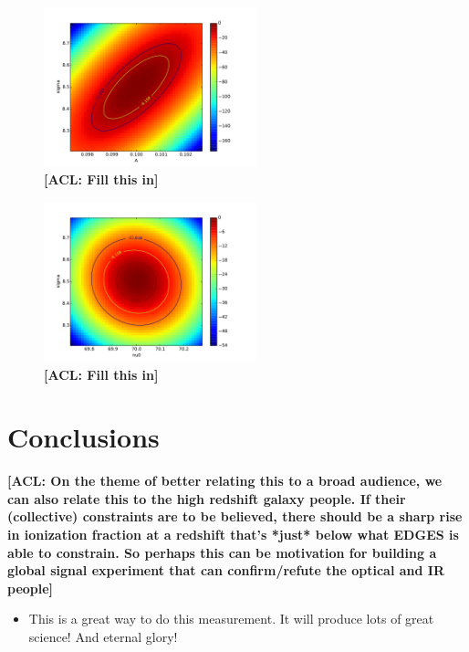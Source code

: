 \documentclass[twolcolumn,apj]{emulateapj}
\newcommand{\acl}[1]{{\color{red} \textbf{[ACL:  #1]}}}
\begin{document}
\begin{figure}[h]
	\centering
	\includegraphics[width=0.55\textwidth]{figures/contours_A_sigma.pdf}
	\caption{\acl{Fill this in}}
\end{figure}

\begin{figure}[h]
	\centering
	\includegraphics[width=0.55\textwidth]{figures/contours_nu0_sigma.pdf}
	\caption{\acl{Fill this in}}
\end{figure}

\section{Conclusions}
\label{sec:Conc}
\acl{On the theme of better relating this to a broad audience, we can also relate this to the high redshift galaxy people.  If their (collective) constraints are to be believed, there should be a sharp rise in ionization fraction at a redshift that's *just* below what EDGES is able to constrain.  So perhaps this can be motivation for building a global signal experiment that can confirm/refute the optical and IR people}
\begin{itemize}
\item This is a great way to do this measurement.  It will produce lots of great science! And eternal glory!
\end{itemize}


{}
\end{document}
